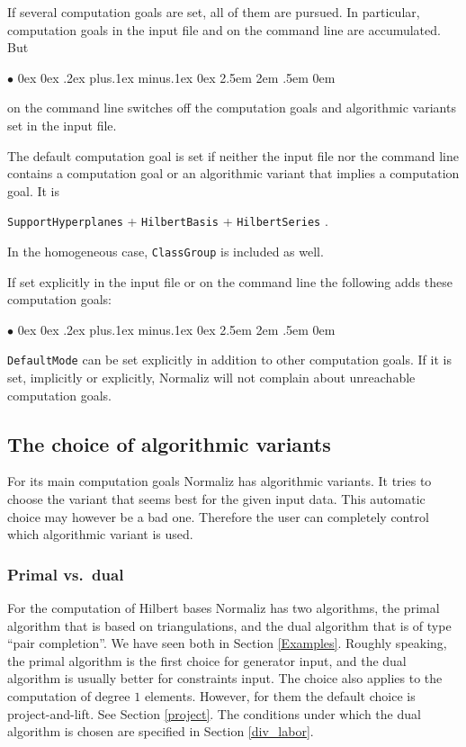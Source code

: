 \documentclass[12pt,a4paper]{scrartcl}
\newcommand{\stdli}{ \topsep0ex \partopsep0ex %
\parsep.2ex plus.1ex minus.1ex \itemsep0ex%
\leftmargin2.5em \labelwidth2em \labelsep.5em \rightmargin0em}%
\renewenvironment{itemize}{\begin{list}{{$\bullet$}}{\stdli}}{\end{list}}
\theoremstyle{definition}
\def\itemtt[#1]{\item[\textbf{\ttt{#1}}]}
\def\ttt{\texttt}
\begin{document}
If several computation goals are set, all of them are pursued. In particular, computation goals in the input file and on the command line are accumulated. But
\begin{itemize}
	\itemtt[-{}-ignore, -i] on the command line switches off the computation goals and algorithmic variants set in the input file.
\end{itemize}

The default computation goal is set if neither the input file nor the command line contains a computation goal or an algorithmic variant that implies a computation goal. It is
\begin{center}
	\verb|SupportHyperplanes| + \verb|HilbertBasis| + \verb|HilbertSeries| .
\end{center} 
In the homogeneous case,  \verb|ClassGroup| is included as well.

If set explicitly in the input file or on the command line the following adds these computation goals:
\begin{itemize}
	\itemtt[DefaultMode]
\end{itemize}

\verb|DefaultMode| can be set explicitly in addition to other computation goals. If it is set, implicitly or explicitly, Normaliz will not complain about unreachable computation goals.

\subsection{The choice of algorithmic variants}

For its main computation goals Normaliz has algorithmic variants. It tries to choose the variant that seems best for the given input data. This automatic choice may however be a bad one. Therefore the user can completely control which algorithmic variant is used.

\subsubsection{Primal vs.\ dual}

For the computation of Hilbert bases Normaliz has two algorithms, the primal algorithm that is based on triangulations, and the dual algorithm that is of type ``pair completion''. We have seen both in Section \ref{Examples}. Roughly speaking, the primal algorithm is the first choice for generator input, and the dual algorithm is usually better for constraints input. The choice also applies to the computation of degree $1$ elements. However, for them the default choice is project-and-lift. See Section \ref{project}. The conditions under which the dual algorithm is chosen are specified in Section \ref{div_labor}.
\end{document}
